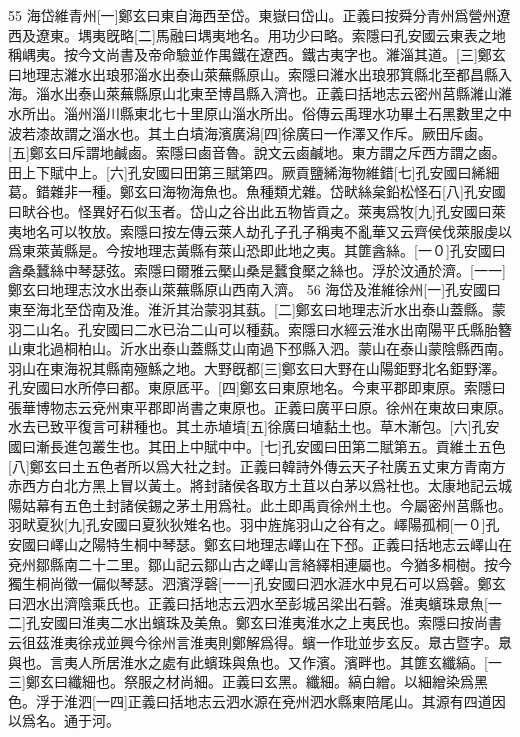 55
海岱維青州[一]鄭玄曰東自海西至岱。東嶽曰岱山。正義曰按舜分青州爲營州遼西及遼東。堣夷旣略[二]馬融曰堣夷地名。用功少曰略。索隱曰孔安國云東表之地稱嵎夷。按今文尚書及帝命驗並作禺鐵在遼西。鐵古夷字也。濰淄其道。[三]鄭玄曰地理志濰水出琅邪淄水出泰山萊蕪縣原山。索隱曰濰水出琅邪箕縣北至都昌縣入海。淄水出泰山萊蕪縣原山北東至博昌縣入濟也。正義曰括地志云密州莒縣濰山濰水所出。淄州淄川縣東北七十里原山淄水所出。俗傳云禹理水功畢土石黑數里之中波若漆故謂之淄水也。其土白墳海濱廣潟[四]徐廣曰一作澤又作斥。厥田斥鹵。[五]鄭玄曰斥謂地鹹鹵。索隱曰鹵音魯。說文云鹵鹹地。東方謂之斥西方謂之鹵。 田上下賦中上。[六]孔安國曰田第三賦第四。厥貢鹽絺海物維錯[七]孔安國曰絺細葛。錯雜非一種。鄭玄曰海物海魚也。魚種類尤雜。岱畎絲枲鉛松怪石[八]孔安國曰畎谷也。怪異好石似玉者。岱山之谷出此五物皆貢之。萊夷爲牧[九]孔安國曰萊夷地名可以牧放。索隱曰按左傳云萊人劫孔子孔子稱夷不亂華又云齊侯伐萊服虔以爲東萊黃縣是。今按地理志黃縣有萊山恐即此地之夷。其篚酓絲。[一０]孔安國曰酓桑蠶絲中琴瑟弦。索隱曰爾雅云檿山桑是蠶食檿之絲也。浮於汶通於濟。[一一]鄭玄曰地理志汶水出泰山萊蕪縣原山西南入濟。
56
海岱及淮維徐州[一]孔安國曰東至海北至岱南及淮。淮沂其治蒙羽其蓺。[二]鄭玄曰地理志沂水出泰山蓋縣。蒙羽二山名。孔安國曰二水已治二山可以種蓺。索隱曰水經云淮水出南陽平氏縣胎簪山東北過桐柏山。沂水出泰山蓋縣艾山南過下邳縣入泗。蒙山在泰山蒙陰縣西南。羽山在東海祝其縣南殛鯀之地。大野旣都[三]鄭玄曰大野在山陽鉅野北名鉅野澤。孔安國曰水所停曰都。東原厎平。[四]鄭玄曰東原地名。今東平郡即東原。索隱曰張華博物志云兗州東平郡即尚書之東原也。正義曰廣平曰原。徐州在東故曰東原。水去已致平復言可耕種也。其土赤埴墳[五]徐廣曰埴黏土也。草木漸包。[六]孔安國曰漸長進包叢生也。其田上中賦中中。[七]孔安國曰田第二賦第五。貢維土五色[八]鄭玄曰土五色者所以爲大社之封。正義曰韓詩外傳云天子社廣五丈東方青南方赤西方白北方黑上冒以黃土。將封諸侯各取方土苴以白茅以爲社也。太康地記云城陽姑幕有五色土封諸侯錫之茅土用爲社。此土即禹貢徐州土也。今屬密州莒縣也。羽畎夏狄[九]孔安國曰夏狄狄雉名也。羽中旌旄羽山之谷有之。嶧陽孤桐[一０]孔安國曰嶧山之陽特生桐中琴瑟。鄭玄曰地理志嶧山在下邳。正義曰括地志云嶧山在兗州鄒縣南二十二里。鄒山記云鄒山古之嶧山言絡繹相連屬也。今猶多桐樹。按今獨生桐尚徵一偏似琴瑟。泗濱浮磬[一一]孔安國曰泗水涯水中見石可以爲磬。鄭玄曰泗水出濟陰乘氏也。正義曰括地志云泗水至彭城呂梁出石磬。淮夷蠙珠臮魚[一二]孔安國曰淮夷二水出蠙珠及美魚。鄭玄曰淮夷淮水之上夷民也。索隱曰按尚書云徂茲淮夷徐戎並興今徐州言淮夷則鄭解爲得。蠙一作玭並步玄反。臮古暨字。臮與也。言夷人所居淮水之處有此蠙珠與魚也。又作濱。濱畔也。其篚玄纖縞。[一三]鄭玄曰纖細也。祭服之材尚細。正義曰玄黑。纖細。縞白繒。以細繒染爲黑色。浮于淮泗[一四]正義曰括地志云泗水源在兗州泗水縣東陪尾山。其源有四道因以爲名。通于河。

